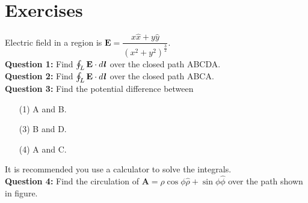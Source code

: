 \documentclass[12pt,a4paper]{article}
\begin{document}
\section{Exercises}
Electric field in a region is $\textbf{E}=\dfrac{x\hat x+y\hat y}{(x^2+y^2)^\frac{3}{2}}$.\\[0.2cm]
\noindent\textbf{Question 1:} Find $\oint_L \textbf{E}\cdot d\textbf{\textit{l}}$ over the closed path ABCDA.\\[0.2cm]
\noindent\textbf{Question 2:} Find $\oint_L \textbf{E}\cdot d\textbf{\textit{l}}$ over the closed path ABCA.\\[0.2cm]
\noindent\textbf{Question 3:} Find the potential difference between
\begin{itemize}
\item[(1)] A and B.
\item[(3)] B and D.
\item[(4)] A and C.
\end{itemize}
\noindent It is recommended you use a calculator to solve the integrals.\\[0.2cm]
\noindent\textbf{Question 4:} Find the circulation of $\textbf{A}=\rho \cos\phi\hat \rho+\sin\phi\hat\phi$ over the path shown in figure.\\[0.2cm]
\end{document}
